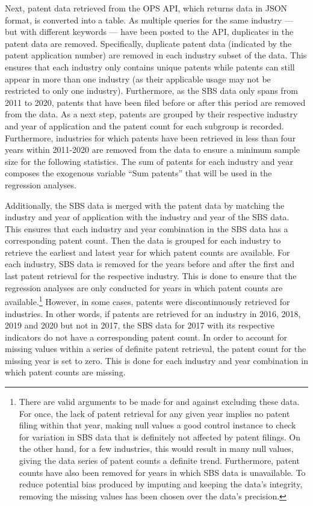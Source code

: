 \documentclass[
  12pt,
  a4paperpaper,
]{article}
\begin{document}
Next, patent data retrieved from the OPS API, which returns data in JSON
format, is converted into a table. As multiple queries for the same
industry --- but with different keywords --- have been posted to the
API, duplicates in the patent data are removed. Specifically, duplicate
patent data (indicated by the patent application number) are removed in
each industry subset of the data. This ensures that each industry only
contains unique patents while patents can still appear in more than one
industry (as their applicable usage may not be restricted to only one
industry). Furthermore, as the SBS data only spans from 2011 to 2020,
patents that have been filed before or after this period are removed
from the data. As a next step, patents are grouped by their respective
industry and year of application and the patent count for each subgroup
is recorded. Furthermore, industries for which patents have been
retrieved in less than four years within 2011-2020 are removed from the
data to ensure a minimum sample size for the following statistics. The
sum of patents for each industry and year composes the exogenous
variable ``Sum patents'' that will be used in the regression analyses.

Additionally, the SBS data is merged with the patent data by matching
the industry and year of application with the industry and year of the
SBS data. This ensures that each industry and year combination in the
SBS data has a corresponding patent count. Then the data is grouped for
each industry to retrieve the earliest and latest year for which patent
counts are available. For each industry, SBS data is removed for the
years before and after the first and last patent retrieval for the
respective industry. This is done to ensure that the regression analyses
are only conducted for years in which patent counts are
available.\footnote{There are valid arguments to be made for and against
  excluding these data. For once, the lack of patent retrieval for any
  given year implies no patent filing within that year, making null
  values a good control instance to check for variation in SBS data that
  is definitely not affected by patent filings. On the other hand, for a
  few industries, this would result in many null values, giving the data
  series of patent counts a definite trend. Furthermore, patent counts
  have also been removed for years in which SBS data is unavailable. To
  reduce potential bias produced by imputing and keeping the data's
  integrity, removing the missing values has been chosen over the data's
  precision.} However, in some cases, patents were discontinuously
retrieved for industries. In other words, if patents are retrieved for
an industry in 2016, 2018, 2019 and 2020 but not in 2017, the SBS data
for 2017 with its respective indicators do not have a corresponding
patent count. In order to account for missing values within a series of
definite patent retrieval, the patent count for the missing year is set
to zero. This is done for each industry and year combination in which
patent counts are missing.\label{cleaning-missing-values}
\end{document}
